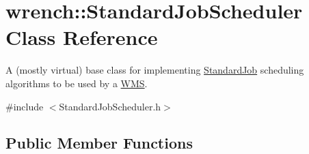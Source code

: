 \hypertarget{classwrench_1_1_standard_job_scheduler}{}\section{wrench\+:\+:Standard\+Job\+Scheduler Class Reference}
\label{classwrench_1_1_standard_job_scheduler}


A (mostly virtual) base class for implementing \hyperlink{classwrench_1_1_standard_job}{Standard\+Job} scheduling algorithms to be used by a \hyperlink{classwrench_1_1_w_m_s}{W\+MS}.  




{\ttfamily \#include $<$Standard\+Job\+Scheduler.\+h$>$}

\subsection*{Public Member Functions}
